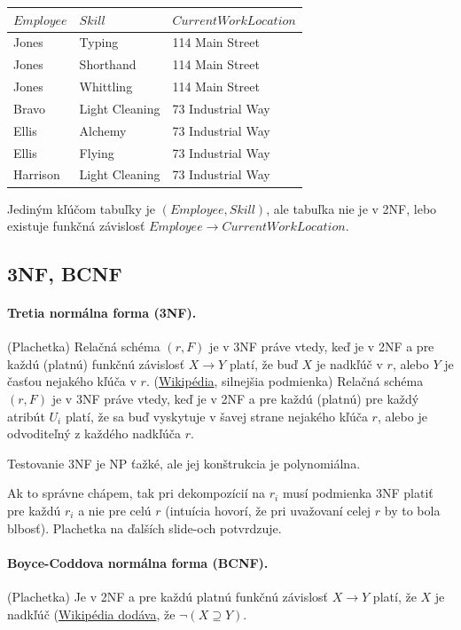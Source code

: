 \documentclass[10pt,a4paper]{article}
\begin{document}
\begin{center}
\begin{tabular}{l|l|l}
$Employee$ & $Skill$ & $Current Work Location$ \\
\hline
Jones &	Typing &	114 Main Street \\
Jones &	Shorthand &	114 Main Street \\
Jones &	Whittling &	114 Main Street \\
Bravo &	Light Cleaning &	73 Industrial Way \\
Ellis &	Alchemy &	73 Industrial Way \\
Ellis &	Flying &	73 Industrial Way \\
Harrison &	Light Cleaning &	73 Industrial Way \\
\end{tabular}
\end{center}

Jediným kľúčom tabuľky je $(Employee, Skill)$, ale tabuľka nie je v 2NF, lebo existuje funkčná závislosť $Employee \rightarrow Current Work Location$.

\subsection{3NF, BCNF}

\paragraph{Tretia normálna forma (3NF).} (Plachetka) Relačná schéma $(r,F)$ je v 3NF práve vtedy, keď je v 2NF a pre každú (platnú) funkčnú závislosť $X \rightarrow Y$ platí, že buď $X$ je nadkľúč v $r$, alebo $Y$ je časťou nejakého kľúča v $r$. 
(\href{http://en.wikipedia.org/wiki/Third_normal_form}{Wikipédia}, silnejšia podmienka) Relačná schéma $(r,F)$ je v 3NF práve vtedy, keď je v 2NF a pre každú (platnú) pre každý atribút $U_i$ platí, že sa buď vyskytuje v šavej strane nejakého kľúča $r$, alebo je odvoditeľný z každého nadkľúča $r$.

Testovanie 3NF je NP ťažké, ale jej konštrukcia je polynomiálna. 

Ak to správne chápem, tak pri dekompozícií na $r_i$ musí podmienka 3NF platiť pre každú $r_i$ a nie pre celú $r$ (intuícia hovorí, že pri uvažovaní celej $r$ by to bola blbosť). 
Plachetka na ďalších slide-och potvrdzuje. 

\paragraph{Boyce-Coddova normálna forma (BCNF).} (Plachetka) Je v 2NF a pre každú platnú funkčnú závislosť $X \rightarrow Y$ platí, že $X$ je nadkľúč (\href{http://en.wikipedia.org/wiki/Boyce\%E2\%80\%93Codd_normal_form}{Wikipédia dodáva}, že $\neg (X \supseteq Y)$. 
\end{document}
